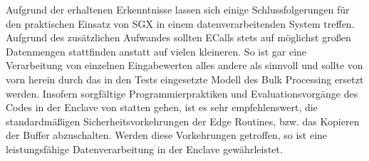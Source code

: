 Aufgrund der erhaltenen Erkenntnisse lassen sich einige Schlussfolgerungen für den praktischen Einsatz von \ac{SGX} in einem datenverarbeitenden System treffen. Aufgrund des zusätzlichen Aufwandes sollten \acp{ECall} stets auf möglichst großen Datenmengen stattfinden anstatt auf vielen kleineren. So ist gar eine Verarbeitung von einzelnen Eingabewerten alles andere als sinnvoll und sollte von vorn herein durch das in den Tests eingesetzte Modell des Bulk Processing ersetzt werden. Insofern sorgfältige Programmierpraktiken und Evaluationsvorgänge des Codes in der Enclave von statten gehen, ist es sehr empfehlenswert, die standardmäßigen Sicherheitsvorkehrungen der Edge Routines, bzw. das Kopieren der Buffer abzuschalten. Werden diese Vorkehrungen getroffen, so ist eine leistungsfähige Datenverarbeitung in der Enclave gewährleistet.